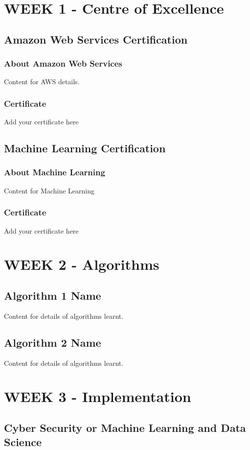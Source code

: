 \chapter{WEEK 1 - Centre of Excellence}

\section{Amazon Web Services Certification}
\subsection{About Amazon Web Services}
Content for AWS details.
\subsection{Certificate}
Add your certificate here

\section{Machine Learning Certification}
\subsection{About Machine Learning}
Content for Machine Learning 
\subsection{Certificate}
Add your certificate here 

\chapter{WEEK 2 - Algorithms}
\section{Algorithm 1 Name}
Content for details of algorithms learnt.
\section{Algorithm 2 Name}
Content for details of algorithms learnt.

\chapter{WEEK 3 - Implementation}
\section{Cyber Security or Machine Learning and Data Science}
